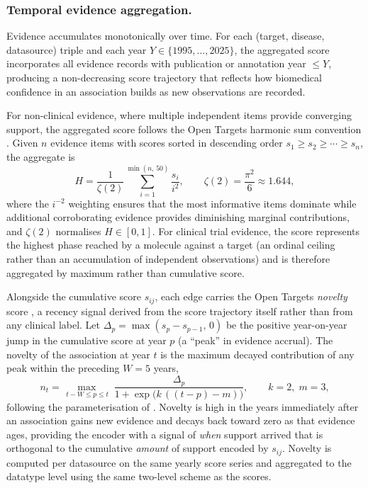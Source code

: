 \documentclass[a4,center]{NAR}
\begin{document}
{\subsubsection{Temporal evidence aggregation.}
\label{sec:ch4-scoring}

Evidence accumulates monotonically over time. For each (target, disease,
datasource) triple and each year $Y \in \{1995, \ldots, 2025\}$, the
aggregated score incorporates all evidence records with publication or
annotation year $\leq Y$, producing a non-decreasing score trajectory that
reflects how biomedical confidence in an association builds as new
observations are recorded.

For non-clinical evidence, where multiple independent items provide
converging support, the aggregated score follows the Open Targets harmonic
sum convention \citep{Ochoa2021OpenPrioritisation}. Given $n$ evidence items with scores
sorted in descending order $s_1 \geq s_2 \geq \cdots \geq s_n$, the
aggregate is
\begin{equation}
    H = \frac{1}{\zeta(2)} \sum_{i=1}^{\min(n,\,50)} \frac{s_i}{i^2},
    \qquad \zeta(2) = \frac{\pi^2}{6} \approx 1.644,
    \label{eq:harmonic}
\end{equation}
where the $i^{-2}$ weighting ensures that the most informative items
dominate while additional corroborating evidence provides diminishing
marginal contributions, and $\zeta(2)$ normalises $H \in [0,1]$. For
clinical trial evidence, the score represents the highest phase reached by
a molecule against a target (an ordinal ceiling rather than an
accumulation of independent observations) and is therefore aggregated by
maximum rather than cumulative score.

Alongside the cumulative score $s_{ij}$, each edge carries the Open Targets
\emph{novelty} score \citep{Falaguera2025TemporalDiscovery}, a recency signal
derived from the score trajectory itself rather than from any clinical label.
Let $\Delta_p = \max(s_p - s_{p-1},\, 0)$ be the positive year-on-year jump in
the cumulative score at year $p$ (a ``peak'' in evidence accrual). The novelty
of the association at year $t$ is the maximum decayed contribution of any peak
within the preceding $W = 5$ years,
\begin{equation}
    n_{t} = \max_{\,t - W \leq p \leq t}\;
        \frac{\Delta_p}{1 + \exp\!\bigl(k\,((t - p) - m)\bigr)},
    \qquad k = 2,\; m = 3,
    \label{eq:novelty}
\end{equation}
following the parameterisation of \citet{Falaguera2025TemporalDiscovery}. Novelty is
high in the years immediately after an association gains new evidence and
decays back toward zero as that evidence ages, providing the encoder with a
signal of \emph{when} support arrived that is orthogonal to the cumulative
\emph{amount} of support encoded by $s_{ij}$. Novelty is computed per
datasource on the same yearly score series and aggregated to the datatype
level using the same two-level scheme as the scores.

}
\end{document}
